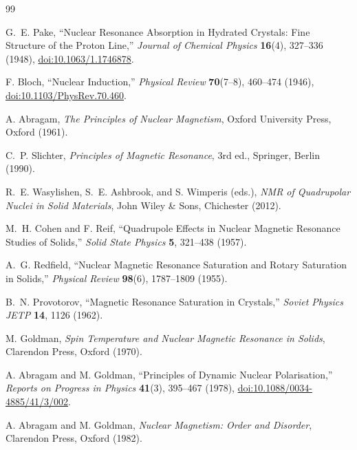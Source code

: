\documentclass[11pt]{article}
\begin{document}
\begin{thebibliography}{99}

G.~E. Pake,
``Nuclear Resonance Absorption in Hydrated Crystals: Fine Structure of the Proton Line,''
\emph{Journal of Chemical Physics} \textbf{16}(4), 327--336 (1948),
\href{https://doi.org/10.1063/1.1746878}{doi:10.1063/1.1746878}.

F. Bloch,
``Nuclear Induction,''
\emph{Physical Review} \textbf{70}(7--8), 460--474 (1946),
\href{https://doi.org/10.1103/PhysRev.70.460}{doi:10.1103/PhysRev.70.460}.

A. Abragam,
\emph{The Principles of Nuclear Magnetism},
Oxford University Press, Oxford (1961).

C.~P. Slichter,
\emph{Principles of Magnetic Resonance}, 3rd ed.,
Springer, Berlin (1990).

R.~E. Wasylishen, S.~E. Ashbrook, and S. Wimperis (eds.),
\emph{NMR of Quadrupolar Nuclei in Solid Materials},
John Wiley \& Sons, Chichester (2012).

M.~H. Cohen and F. Reif,
``Quadrupole Effects in Nuclear Magnetic Resonance Studies of Solids,''
\emph{Solid State Physics} \textbf{5}, 321--438 (1957).

A.~G. Redfield,
``Nuclear Magnetic Resonance Saturation and Rotary Saturation in Solids,''
\emph{Physical Review} \textbf{98}(6), 1787--1809 (1955).

B.~N. Provotorov,
``Magnetic Resonance Saturation in Crystals,''
\emph{Soviet Physics JETP} \textbf{14}, 1126 (1962).

M. Goldman,
\emph{Spin Temperature and Nuclear Magnetic Resonance in Solids},
Clarendon Press, Oxford (1970).

A. Abragam and M. Goldman,
``Principles of Dynamic Nuclear Polarisation,''
\emph{Reports on Progress in Physics} \textbf{41}(3), 395--467 (1978),
\href{https://doi.org/10.1088/0034-4885/41/3/002}{doi:10.1088/0034-4885/41/3/002}.

A. Abragam and M. Goldman,
\emph{Nuclear Magnetism: Order and Disorder},
Clarendon Press, Oxford (1982).


\end{thebibliography}
\end{document}
